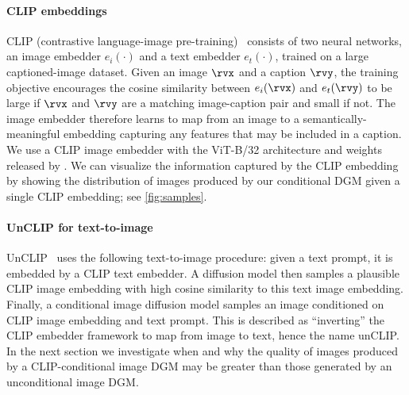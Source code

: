 \paragraph{CLIP embeddings}
CLIP (contrastive language-image pre-training)~\citep{radford2021learning} consists of two neural networks, an image embedder $e_i(\cdot)$ and a text embedder $e_t(\cdot)$, trained on a large captioned-image dataset. Given an image $\rvx$ and a caption $\rvy$, the training objective encourages the cosine similarity between $e_i(\rvx)$ and $e_t(\rvy)$ to be large if $\rvx$ and $\rvy$ are a matching image-caption pair and small if not.
The image embedder therefore learns to map from an image to a semantically-meaningful embedding capturing any features that may be included in a caption. We use a CLIP image embedder with the ViT-B/32 architecture and weights released by \citet{radford2021learning}. We can visualize the information captured by the CLIP embedding by showing the distribution of images produced by our conditional DGM given a single CLIP embedding; see \cref{fig:samples}.

\paragraph{UnCLIP for text-to-image}
UnCLIP~\citep{ramesh2022hierarchical} uses the following text-to-image procedure: given a text prompt, it is embedded by a CLIP text embedder. A diffusion model then samples a plausible CLIP image embedding with high cosine similarity to this text image embedding. Finally, a conditional image diffusion model samples an image conditioned on CLIP image embedding and text prompt. This is described as ``inverting'' the CLIP embedder framework to map from image to text, hence the name unCLIP. In the next section we investigate when and why the quality of images produced by a CLIP-conditional image DGM may be greater than those generated by an unconditional image DGM.


